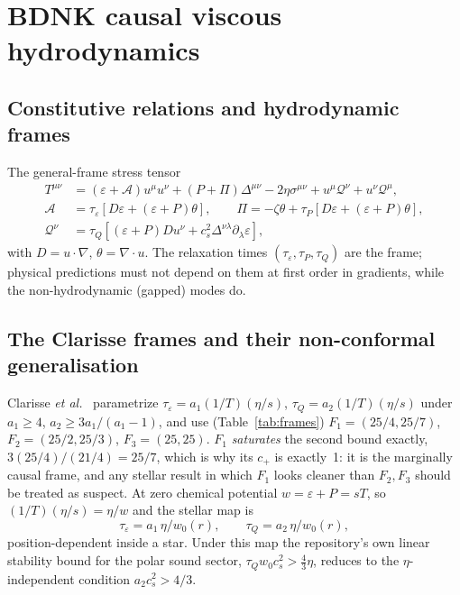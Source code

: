 \documentclass[aps,prd,preprint,amsmath,amssymb,nofootinbib,longbibliography]{revtex4-2}
\newcommand{\cs}{c_s}
\begin{document}
\section{BDNK causal viscous hydrodynamics}
\label{sec:bdnk}

\subsection{Constitutive relations and hydrodynamic frames}
The general-frame stress tensor~\cite{BDN2022}
\begin{align}
T^{\mu\nu} &= (\varepsilon + \mathcal A)u^\mu u^\nu + (P + \Pi)\Delta^{\mu\nu} - 2\eta\sigma^{\mu\nu}
 + u^\mu\mathcal Q^\nu + u^\nu\mathcal Q^\mu,\\
\mathcal A &= \tau_\varepsilon[D\varepsilon + (\varepsilon+P)\theta],\qquad
\Pi = -\zeta\theta + \tau_P[D\varepsilon + (\varepsilon+P)\theta],\\
\mathcal Q^\nu &= \tau_Q[(\varepsilon+P)Du^\nu + \cs^2\Delta^{\nu\lambda}\partial_\lambda\varepsilon],
\end{align}
with $D = u\cdot\nabla$, $\theta = \nabla\cdot u$. The relaxation times
$(\tau_\varepsilon,\tau_P,\tau_Q)$ are the frame; physical predictions must not depend on them
at first order in gradients, while the non-hydrodynamic (gapped) modes do.

\subsection{The Clarisse frames and their non-conformal generalisation}
Clarisse \emph{et al.}~\cite{Clarisse2025} parametrize $\tau_\varepsilon = a_1(1/T)(\eta/s)$,
$\tau_Q = a_2(1/T)(\eta/s)$ under $a_1\ge4$, $a_2 \ge 3a_1/(a_1-1)$, and use
(Table~\ref{tab:frames}) $F_1 = (25/4,25/7)$, $F_2 = (25/2,25/3)$, $F_3 = (25,25)$. $F_1$
\emph{saturates} the second bound exactly, $3(25/4)/(21/4) = 25/7$, which is why its $c_+$ is
exactly~1: it is the marginally causal frame, and any stellar result in which $F_1$ looks cleaner
than $F_2,F_3$ should be treated as suspect. At zero chemical potential $w = \varepsilon+P = sT$,
so $(1/T)(\eta/s) = \eta/w$ and the stellar map is
\begin{equation}
\tau_\varepsilon = a_1\,\eta/w_0(r), \qquad \tau_Q = a_2\,\eta/w_0(r),
\label{eq:map}
\end{equation}
position-dependent inside a star. Under this map the repository's own linear stability bound
for the polar sound sector, $\tau_Qw_0\cs^2 > \tfrac43\eta$, reduces to the $\eta$-independent
condition $a_2\cs^2 > 4/3$.
\end{document}
